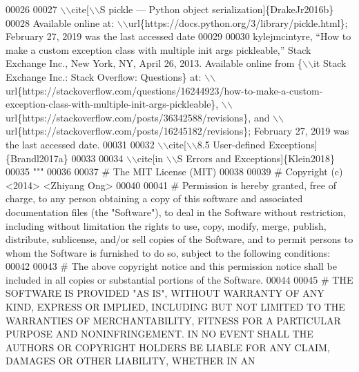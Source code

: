 \begin{DoxyCode}
00026 \textcolor{stringliteral}{}
00027 \textcolor{stringliteral}{    \(\backslash\)\(\backslash\)cite[\(\backslash\)\(\backslash\)S pickle — Python object serialization]\{DrakeJr2016b\}}
00028 \textcolor{stringliteral}{        Available online at: \(\backslash\)\(\backslash\)url\{https://docs.python.org/3/library/pickle.html\}; February 27, 2019 was
       the last accessed date}
00029 \textcolor{stringliteral}{}
00030 \textcolor{stringliteral}{    kylejmcintyre, ``How to make a custom exception class with multiple init args pickleable,'' Stack
       Exchange Inc., New York, NY, April 26, 2013. Available online from \{\(\backslash\)\(\backslash\)it Stack Exchange Inc.: Stack Overflow:
       Questions\} at:
       \(\backslash\)\(\backslash\)url\{https://stackoverflow.com/questions/16244923/how-to-make-a-custom-exception-class-with-multiple-init-args-pickleable\}, \(\backslash\)\(\backslash\)url\{https://stackoverflow.com/posts/36342588/revisions\}, and
       \(\backslash\)\(\backslash\)url\{https://stackoverflow.com/posts/16245182/revisions\}; February 27, 2019 was the last accessed date.}
00031 \textcolor{stringliteral}{}
00032 \textcolor{stringliteral}{    \(\backslash\)\(\backslash\)cite[\(\backslash\)\(\backslash\)8.5 User-defined Exceptions]\{Brandl2017a\}}
00033 \textcolor{stringliteral}{}
00034 \textcolor{stringliteral}{    \(\backslash\)\(\backslash\)cite[in \(\backslash\)\(\backslash\)S Errors and Exceptions]\{Klein2018\}}
00035 \textcolor{stringliteral}{"""}
00036 
00037 \textcolor{comment}{#   The MIT License (MIT)}
00038 
00039 \textcolor{comment}{#   Copyright (c) <2014> <Zhiyang Ong>}
00040 
00041 \textcolor{comment}{#   Permission is hereby granted, free of charge, to any person obtaining a copy of this software and
       associated documentation files (the "Software"), to deal in the Software without restriction, including without
       limitation the rights to use, copy, modify, merge, publish, distribute, sublicense, and/or sell copies of the
       Software, and to permit persons to whom the Software is furnished to do so, subject to the following
       conditions:}
00042 
00043 \textcolor{comment}{#   The above copyright notice and this permission notice shall be included in all copies or substantial
       portions of the Software.}
00044 
00045 \textcolor{comment}{#   THE SOFTWARE IS PROVIDED "AS IS", WITHOUT WARRANTY OF ANY KIND, EXPRESS OR IMPLIED, INCLUDING BUT NOT
       LIMITED TO THE WARRANTIES OF MERCHANTABILITY, FITNESS FOR A PARTICULAR PURPOSE AND NONINFRINGEMENT. IN NO
       EVENT SHALL THE AUTHORS OR COPYRIGHT HOLDERS BE LIABLE FOR ANY CLAIM, DAMAGES OR OTHER LIABILITY, WHETHER IN AN
}
\end{DoxyCode}
